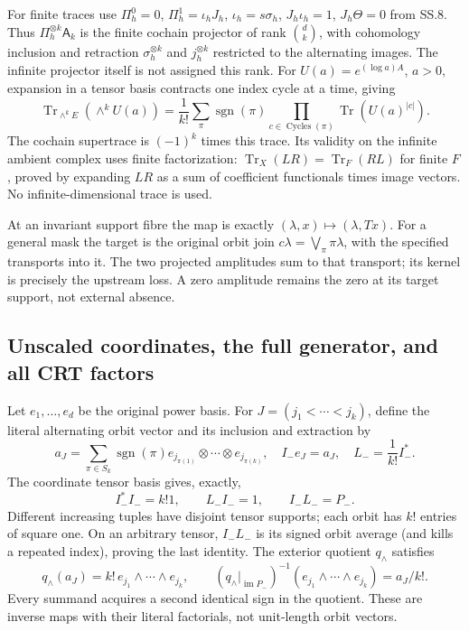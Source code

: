 For finite traces use \(\Pi_h^0=0\),
\(\Pi_h^1=\iota_hJ_h\), \(\iota_h=s\sigma_h\),
\(J_h\iota_h=1\), \(J_h\Theta=0\) from SS.8.  Thus
\(\Pi_h^{\otimes k}\mathsf A_k\) is the finite cochain projector
of rank \(\binom dk\), with cohomology inclusion and retraction
\(\sigma_h^{\otimes k}\) and \(j_h^{\otimes k}\) restricted to
the alternating images.  The infinite projector itself is not assigned
this rank.  For \(U(a)=e^{(\log a)A}\), \(a>0\), expansion in a
tensor basis contracts one index cycle at a time, giving
\[
 \operatorname{Tr}_{\wedge^k E}(\wedge^k U(a))
 =\frac1{k!}\sum_\pi\operatorname{sgn}(\pi)
               \prod_{c\in\operatorname{Cycles}(\pi)}
                      \operatorname{Tr}(U(a)^{|c|}).
 \tag{EA.9}
\]
The cochain supertrace is \((-1)^k\) times this trace.  Its validity
on the infinite ambient complex uses finite factorization:
\(\operatorname{Tr}_X(LR)=\operatorname{Tr}_F(RL)\) for finite
\(F\), proved by expanding \(LR\) as a sum of coefficient
functionals times image vectors.  No infinite-dimensional trace is used.

At an invariant support fibre the map is exactly
\((\lambda,x)\mapsto(\lambda,Tx)\).  For a general mask the target is
the original orbit join \(c\lambda=\bigvee_\pi\pi\lambda\), with
the specified transports into it.  The two projected amplitudes sum to
that transport; its kernel is precisely the upstream loss.  A zero
amplitude remains the zero at its target support, not external absence.

\subsection{Unscaled coordinates, the full generator, and all CRT factors}

Let \(e_1,\ldots,e_d\) be the original power basis.  For
\(J=(j_1<\cdots<j_k)\), define the literal alternating orbit vector
and its inclusion and extraction by
\[
 a_J=\sum_{\pi\in S_k}\operatorname{sgn}(\pi)
       e_{j_{\pi(1)}}\otimes\cdots\otimes e_{j_{\pi(k)}},\quad
 I_-e_J=a_J,\quad L_-=\frac1{k!}I_-^*.
 \tag{EA.10}
\]
The coordinate tensor basis gives, exactly,
\[
 I_-^*I_-=k!1,\qquad L_-I_-=1,\qquad I_-L_-=P_-.
 \tag{EA.11}
\]
Different increasing tuples have disjoint tensor supports; each orbit has
\(k!\) entries of square one.  On an arbitrary tensor, \(I_-L_-\)
is its signed orbit average (and kills a repeated index), proving the
last identity.  The exterior quotient \(q_\wedge\) satisfies
\[
 q_\wedge(a_J)=k!\,e_{j_1}\wedge\cdots\wedge e_{j_k},\qquad
 (q_\wedge|_{\operatorname{im}P_-})^{-1}
       (e_{j_1}\wedge\cdots\wedge e_{j_k})=a_J/k!.
 \tag{EA.12}
\]
Every summand acquires a second identical sign in the quotient.  These
are inverse maps with their literal factorials, not unit-length orbit
vectors.

